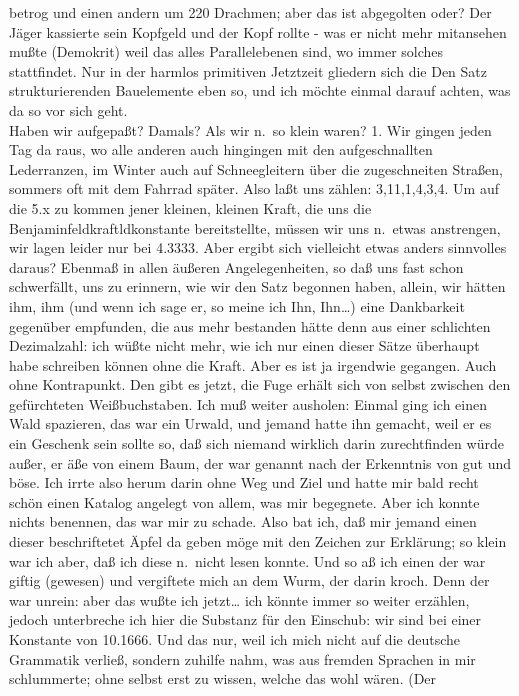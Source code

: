 \documentclass[
]{article}
\begin{document}
betrog und einen andern um 220 Drachmen; aber das ist abgegolten oder?
Der Jäger kassierte sein Kopfgeld und der Kopf rollte - was er nicht
mehr mitansehen mußte (Demokrit) weil das alles Parallelebenen sind, wo
immer solches stattfindet. Nur in der harmlos primitiven Jetztzeit
gliedern sich die Den Satz strukturierenden Bauelemente eben so, und ich
möchte einmal darauf achten, was da so vor sich geht.\\
Haben wir aufgepaßt? Damals? Als wir n.~so klein waren? 1. Wir gingen
jeden Tag da raus, wo alle anderen auch hingingen mit den
aufgeschnallten Lederranzen, im Winter auch auf Schneegleitern über die
zugeschneiten Straßen, sommers oft mit dem Fahrrad später. Also laßt uns
zählen: 3,11,1,4,3,4. Um auf die 5.x zu kommen jener kleinen, kleinen
Kraft, die uns die Benjaminfeldkraftldkonstante bereitstellte, müssen
wir uns n.~etwas anstrengen, wir lagen leider nur bei 4.3333. Aber
ergibt sich vielleicht etwas anders sinnvolles daraus? Ebenmaß in allen
äußeren Angelegenheiten, so daß uns fast schon schwerfällt, uns zu
erinnern, wie wir den Satz begonnen haben, allein, wir hätten ihm, ihm
(und wenn ich sage er, so meine ich Ihn, Ihn\ldots) eine Dankbarkeit
gegenüber empfunden, die aus mehr bestanden hätte denn aus einer
schlichten Dezimalzahl: ich wüßte nicht mehr, wie ich nur einen dieser
Sätze überhaupt habe schreiben können ohne die Kraft. Aber es ist ja
irgendwie gegangen. Auch ohne Kontrapunkt. Den gibt es jetzt, die Fuge
erhält sich von selbst zwischen den gefürchteten Weißbuchstaben. Ich muß
weiter ausholen: Einmal ging ich einen Wald spazieren, das war ein
Urwald, und jemand hatte ihn gemacht, weil er es ein Geschenk sein
sollte so, daß sich niemand wirklich darin zurechtfinden würde außer, er
äße von einem Baum, der war genannt nach der Erkenntnis von gut und
böse. Ich irrte also herum darin ohne Weg und Ziel und hatte mir bald
recht schön einen Katalog angelegt von allem, was mir begegnete. Aber
ich konnte nichts benennen, das war mir zu schade. Also bat ich, daß mir
jemand einen dieser beschriftetet Äpfel da geben möge mit den Zeichen
zur Erklärung; so klein war ich aber, daß ich diese n.~nicht lesen
konnte. Und so aß ich einen der war giftig (gewesen) und vergiftete mich
an dem Wurm, der darin kroch. Denn der war unrein: aber das wußte ich
jetzt\ldots{} ich könnte immer so weiter erzählen, jedoch unterbreche
ich hier die Substanz für den Einschub: wir sind bei einer Konstante von
10.1666. Und das nur, weil ich mich nicht auf die deutsche Grammatik
verließ, sondern zuhilfe nahm, was aus fremden Sprachen in mir
schlummerte; ohne selbst erst zu wissen, welche das wohl wären. (Der
\end{document}
